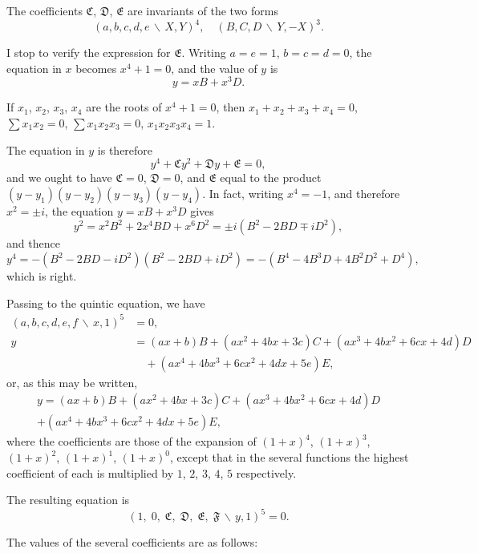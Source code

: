 \documentclass[11pt,a4paper]{book}
\begin{document}
\newpage

The coefficients $\mathfrak{C}$, $\mathfrak{D}$, $\mathfrak{E}$ are invariants of the two forms
\[(a,b,c,d,e\,\backslash\!\!\,X,Y)^{4}, \quad (B,C,D\,\backslash\!\!\,Y,-X)^{3}.\]

I stop to verify the expression for $\mathfrak{E}$. Writing $a=e=1$, $b=c=d=0$, the
equation in $x$ becomes $x^{4}+1=0$, and the value of $y$ is
\[y = xB + x^{3}D.\]

If $x_{1}$, $x_{2}$, $x_{3}$, $x_{4}$ are the roots of $x^{4}+1=0$, then
$x_{1}+x_{2}+x_{3}+x_{4}=0$,
$\sum x_{1}x_{2}=0$,
$\sum x_{1}x_{2}x_{3}=0$,
$x_{1}x_{2}x_{3}x_{4}=1$.

The equation in $y$ is therefore
\[y^{4} + \mathfrak{C}y^{2} + \mathfrak{D}y + \mathfrak{E} = 0,\]
and we ought to have $\mathfrak{C}=0$, $\mathfrak{D}=0$, and $\mathfrak{E}$ equal to the
product $(y-y_{1})(y-y_{2})(y-y_{3})(y-y_{4})$. In fact, writing $x^{4}=-1$, and therefore
$x^{2}=\pm i$, the equation $y=xB+x^{3}D$ gives
\[y^{2} = x^{2}B^{2} + 2x^{4}BD + x^{6}D^{2} = \pm i(B^{2}-2BD \mp iD^{2}),\]
and thence
\[y^{4} = -(B^{2}-2BD-iD^{2})(B^{2}-2BD+iD^{2}) = -(B^{4}-4B^{3}D+4B^{2}D^{2}+D^{4}),\]
which is right.

Passing to the quintic equation, we have
\begin{align*}
(a,b,c,d,e,f\,\backslash\!\!\,x,1)^{5} &= 0,\\
y &= (ax+b)B + (ax^{2}+4bx+3c)C + (ax^{3}+4bx^{2}+6cx+4d)D \\
&\quad + (ax^{4}+4bx^{3}+6cx^{2}+4dx+5e)E,
\end{align*}
or, as this may be written,
\begin{multline*}
y = (ax+b)B + (ax^{2}+4bx+3c)C + (ax^{3}+4bx^{2}+6cx+4d)D \\
+ (ax^{4}+4bx^{3}+6cx^{2}+4dx+5e)E,
\end{multline*}
where the coefficients are those of the expansion of $(1+x)^{4}$, $(1+x)^{3}$, $(1+x)^{2}$,
$(1+x)^{1}$, $(1+x)^{0}$, except that in the several functions the highest coefficient of
each is multiplied by $1$, $2$, $3$, $4$, $5$ respectively.

The resulting equation is
\[(1,\; 0,\; \mathfrak{C},\; \mathfrak{D},\; \mathfrak{E},\; \mathfrak{F}\,\backslash\!\!\,y,1)^{5} = 0.\]

\newpage

The values of the several coefficients are as follows:
\end{document}

